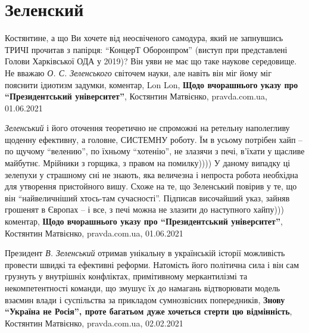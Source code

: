  
 
 
 
 
\chapter{Зеленский}
\label{sec:slova.zelenskii}

Костянтине, а що Ви хочете від неосвіченого самодура, який не запнувшись ТРИЧІ
прочитав з папірця: \enquote{КонцерТ Оборонпром} (виступ при представлені Голови
Харківської ОДА у 2019)?
Він уяви не має що таке наукове середовище. Не вважаю \emph{О. С. Зеленського} світочем
науки, але навіть він міг йому міг пояснити ідиотизм задумки,
коментар, Lon Lon, \textbf{Щодо вчорашнього указу про \enquote{Президентський університет}}, 
Костянтин Матвієнко, pravda.com.ua, 01.06.2021

\emph{Зеленський} і його оточення теоретично не спроможні на ретельну наполегливу
щоденну ефективну, а головне, СИСТЕМНУ роботу. Їм в усьому потрібен хайп – по
щучому \enquote{велению}, по їхньому \enquote{хотенію}, не злазячи з печі, в'їхати у щасливе
майбутнє. Мрійники з горщика, з правом на помилку))))
У даному випадку ці зелепухи у страшному сні не знають, яка величезна і
непроста робота необхідна для утворення пристойного вишу. Схоже на те, що
Зеленський повірив у те, що він \enquote{найвеличніший хтось-там сучасності}. Підписав
височайший указ, зайняв грошенят в Європах – і все, з печі можна не злазити до
наступного хайпу)))
коментар, \textbf{Щодо вчорашнього указу про \enquote{Президентський університет}}, 
Костянтин Матвієнко, pravda.com.ua, 01.06.2021

Президент \emph{В. Зеленський} отримав унікальну в українській історії можливість
провести швидкі та ефективні реформи. Натомість його політична сила і він сам
грузнуть у внутрішніх конфліктах, примітивному меркантилізмі та
некомпетентності команди, що змушує їх до намагань відтворювати модель взаємин
влади і суспільства за прикладом сумнозвісних попередників,
\textbf{Знову \enquote{Україна не Росія}, проте багатьом дуже хочеться стерти цю відмінність},
Костянтин Матвієнко, pravda.com.ua, 02.02.2021

